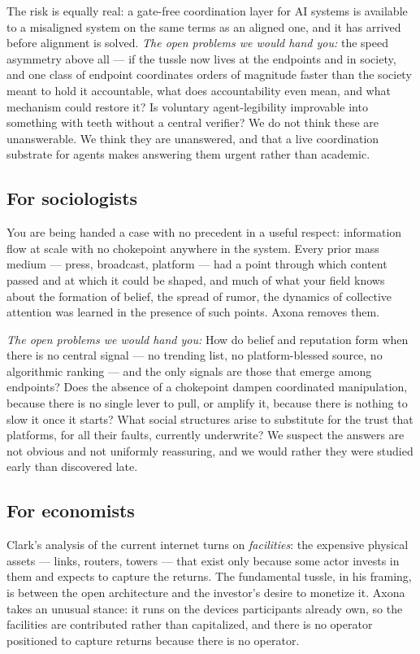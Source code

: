 \documentclass[nobib,justified]{tufte-handout}
\begin{document}
The risk is equally real: a gate-free coordination layer for AI systems is
available to a misaligned system on the same terms as an aligned one, and it has
arrived before alignment is solved. \emph{The open problems we would hand you:}
the speed asymmetry above all --- if the tussle now lives at the endpoints and in
society, and one class of endpoint coordinates orders of magnitude faster than the
society meant to hold it accountable, what does accountability even mean, and what
mechanism could restore it? Is voluntary agent-legibility improvable into
something with teeth without a central verifier? We do not think these are
unanswerable. We think they are unanswered, and that a live coordination substrate
for agents makes answering them urgent rather than academic.

\subsection{For sociologists}

You are being handed a case with no precedent in a useful respect: information
flow at scale with no chokepoint anywhere in the system. Every prior mass medium
--- press, broadcast, platform --- had a point through which content passed and at
which it could be shaped, and much of what your field knows about the formation of
belief, the spread of rumor, the dynamics of collective attention was learned in
the presence of such points. Axona removes them.

\emph{The open problems we would hand you:} How do belief and reputation form when
there is no central signal --- no trending list, no platform-blessed source, no
algorithmic ranking --- and the only signals are those that emerge among
endpoints? Does the absence of a chokepoint dampen coordinated manipulation,
because there is no single lever to pull, or amplify it, because there is nothing
to slow it once it starts? What social structures arise to substitute for the
trust that platforms, for all their faults, currently underwrite? We suspect the
answers are not obvious and not uniformly reassuring, and we would rather they
were studied early than discovered late.

\subsection{For economists}

Clark's analysis of the current internet turns on \emph{facilities}: the expensive
physical assets --- links, routers, towers --- that exist only because some actor
invests in them and expects to capture the returns. The fundamental tussle, in his
framing, is between the open architecture and the investor's desire to monetize
it. Axona takes an unusual stance: it runs on the devices participants already
own, so the facilities are contributed rather than capitalized, and there is no
operator positioned to capture returns because there is no operator.
\end{document}
